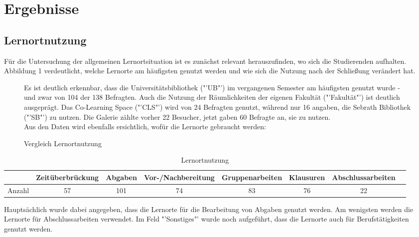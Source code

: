 \documentclass[11pt, a4paper]{article}
\begin{document}
\newpage
\section{Ergebnisse}
\subsection{Lernortnutzung}
Für die Untersuchung der allgemeinen Lernortsituation ist es zunächst relevant herauszufinden, wo sich die Studierenden aufhalten. Abbildung 1 verdeutlicht, welche Lernorte am häufigsten genutzt werden und wie sich die Nutzung nach der Schließung verändert hat.
\begin{figure}[h]
 
 \vspace{0.1cm}
 \caption{Vergleich Lernortnutzung}
 \vspace{0.6cm}

Es ist deutlich erkennbar, dass die Universitätsbibliothek ("'UB"') im vergangenen Semester am häufigsten genutzt wurde - und zwar von 104 der 138 Befragten. Auch die Nutzung der Räumlichkeiten der eigenen Fakultät ("'Fakultät"') ist deutlich ausgeprägt. Das Co-Learning Space ("'CLS"') wird von 24  Befragten genutzt, während nur 16 angaben, die Sebrath Bibliothek ("'SB"') zu nutzen. 
Die Galerie zählte vorher 22 Besucher, jetzt gaben 60 Befragte an, sie zu nutzen.\\

Aus den Daten wird ebenfalls ersichtlich, wofür die Lernorte gebraucht werden:



\end{figure}
\begin{table}[h]
	\begin{tabular}{c|ccccccc}
		& Zeitüberbrückung & Abgaben & Vor-/Nachbereitung & Gruppenarbeiten & Klausuren & Abschlussarbeiten \\ \hline
		Anzahl & 57            & 101             & 74                          & 83                     & 76                 & 22                      
	\end{tabular}
		\caption{Lernortnutzung}
\end{table}

Hauptsächlich wurde dabei angegeben, dass die Lernorte für die Bearbeitung von Abgaben genutzt werden. Am wenigsten werden die Lernorte für Abschlussarbeiten verwendet. Im Feld "'Sonstiges"' wurde noch aufgeführt, dass die Lernorte auch für Berufstätigkeiten genutzt werden.
\end{document}

